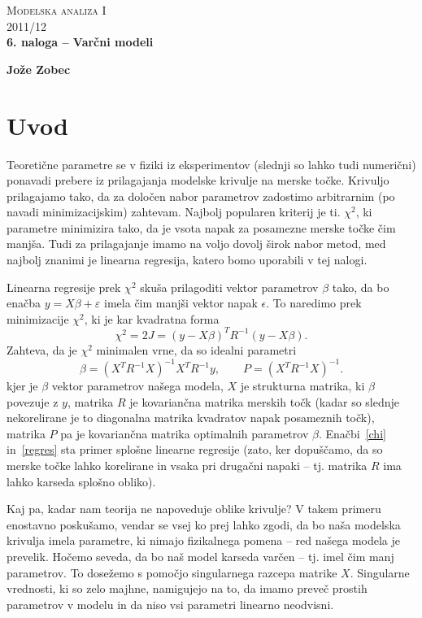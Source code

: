 \documentclass[a4 paper, 12pt]{article}
\begin{document}
\begin{center}
\textsc{Modelska analiza I}\\
\textsc{2011/12}\\[0.5cm]
\textbf{6. naloga -- Var\v cni modeli}
\end{center}
\begin{flushright}
\textbf{Jo\v ze Zobec}
\end{flushright}

\section{Uvod}

Teoreti\v cne parametre se v fiziki iz eksperimentov (slednji so lahko tudi numeri\v cni) ponavadi prebere iz
prilagajanja modelske krivulje na merske to\v cke. Krivuljo prilagajamo tako, da za dolo\v cen nabor parametrov
zadostimo arbitrarnim (po navadi minimizacijskim) zahtevam. Najbolj popularen kriterij je ti. $\chi^2$, ki parametre
minimizira tako, da je vsota napak za posamezne merske to\v cke \v cim manj\v sa. Tudi za prilagajanje imamo na
voljo dovolj \v sirok nabor metod, med najbolj znanimi je linearna regresija, katero bomo uporabili v tej
nalogi.

Linearna regresije prek $\chi^2$ sku\v sa prilagoditi vektor parametrov $\beta$ tako, da bo ena\v cba $y = X\beta +
\varepsilon$ imela \v cim manj\v si vektor napak $\epsilon$. To naredimo prek minimizacije $\chi^2$, ki je kar
kvadratna forma
\begin{equation}
	\chi^2 = 2J = (y - X\beta)^T R^{-1} (y - X\beta).
	\label{chi}
\end{equation}
Zahteva, da je $\chi^2$ minimalen vrne, da so idealni parametri
\begin{equation}
	\beta = (X^T R^{-1} X)^{-1} X^T R^{-1} y, \qquad P = (X^T R^{-1} X)^{-1}.
	\label{regres}
\end{equation}
kjer je $\beta$ vektor parametrov na\v sega modela, $X$ je strukturna matrika, ki $\beta$ povezuje z $y$, matrika $R$
je kovarian\v cna matrika merskih to\v ck (kadar so slednje nekorelirane je to diagonalna matrika kvadratov napak
posameznih to\v ck), matrika $P$ pa je kovarian\v cna matrika optimalnih parametrov $\beta$. Ena\v cbi~\eqref{chi}
in~\eqref{regres} sta primer splo\v sne linearne regresije (zato, ker dopu\v s\v camo, da so merske to\v cke lahko
korelirane in vsaka pri druga\v cni napaki -- tj. matrika $R$ ima lahko karseda splo\v sno obliko).

Kaj pa, kadar nam teorija ne napoveduje oblike krivulje? V takem primeru enostavno posku\v samo, vendar se vsej ko
prej lahko zgodi, da bo na\v sa modelska krivulja imela parametre, ki nimajo fizikalnega pomena -- red na\v sega
modela je prevelik. Ho\v cemo seveda, da bo na\v s model karseda var\v cen -- tj. imel \v cim manj parametrov.
To dose\v zemo s pomo\v cjo singularnega razcepa matrike $X$. Singularne vrednosti, ki so zelo majhne,
namigujejo na to, da imamo preve\v c prostih parametrov v modelu in da niso vsi parametri linearno neodvisni.
\end{document}
